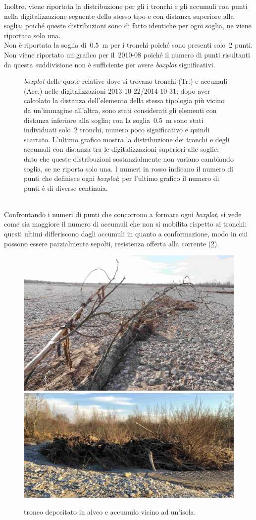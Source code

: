 Inoltre, viene riportata la distribuzione per gli i tronchi e gli accumuli con punti nella digitalizzazione seguente dello stesso tipo e con distanza superiore alla soglia; poiché queste distribuzioni sono di fatto identiche per ogni soglia, ne viene riportata solo una.
\\
Non è riportata la soglia di~\SI{0.5}{\m} per i tronchi poiché sono presenti solo~2 punti.
Non viene riportato un grafico per il~2010-08 poiché il numero di punti risultanti da questa suddivisione non è sufficiente per avere \emph{boxplot} significativi.
%
\begin{figure}
	\centering
	
	\caption[\emph{boxplot} delle quote relative distinte per tronchi e accumuli legnosi]{\emph{boxplot} delle quote relative dove si trovano tronchi (Tr.) e accumuli (Acc.) nelle digitalizzazioni 2013-10-22/2014-10-31; dopo aver calcolato la distanza dell'elemento della stessa tipologia più vicino da un'immagine all'altra, sono stati considerati gli elementi con distanza inferiore alla soglia; con la soglia~\SI{0.5}{\m} sono stati individuati solo~\num{2} tronchi, numero poco significativo e quindi scartato.
	L'ultimo grafico mostra la distribuzione dei tronchi e degli accumuli con distanza tra le digitalizzazioni superiori alle soglie; dato che queste distribuzioni sostanzialmente non variano cambiando soglia, se ne riporta solo una.
	I numeri in rosso indicano il numero di punti che definisce ogni \emph{boxplot}; per l'ultimo grafico il numero di punti è di diverse centinaia.}
	\label{graph:legno-wj-dem-detrended-distanza}
\end{figure}
%
\\
Confrontando i numeri di punti che concorrono a formare ogni \emph{boxplot}, si vede come sia maggiore il numero di accumuli che non si mobilita rispetto ai tronchi: questi ultimi differiscono dagli accumuli in quanto a conformazione, modo in cui possono essere parzialmente sepolti, resistenza offerta alla corrente (\cref{fig:tronco-vs-accumulo}).
%
\begin{figure}
	\centering
	\includegraphics[height = 0.27\textwidth]{files/tronco.jpeg}
	\quad
	\includegraphics[height = 0.27\textwidth]{files/accumulo.jpeg}
	\caption[tronco depositato in alveo e accumulo vicino ad un'isola]{tronco depositato in alveo e accumulo vicino ad un'isola.}
	\label{fig:tronco-vs-accumulo}
\end{figure}
